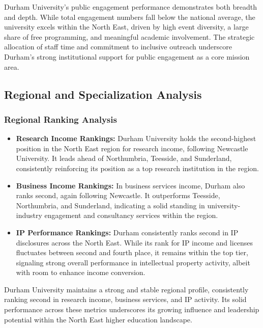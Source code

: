 \documentclass[journal,onecolumn, 10pt,draftclsnofoot]{IEEEtran}
\begin{document}
Durham University's public engagement performance demonstrates both breadth and depth. While total engagement numbers fall below the national average, the university excels within the North East, driven by high event diversity, a large share of free programming, and meaningful academic involvement. The strategic allocation of staff time and commitment to inclusive outreach underscore Durham's strong institutional support for public engagement as a core mission area.

\subsection{Regional and Specialization Analysis}

\subsubsection{Regional Ranking Analysis}

\begin{itemize}
    \item \textbf{Research Income Rankings:} Durham University holds the second-highest position in the North East region for research income, following Newcastle University. It leads ahead of Northumbria, Teesside, and Sunderland, consistently reinforcing its position as a top research institution in the region.
    
    \item \textbf{Business Income Rankings:} In business services income, Durham also ranks second, again following Newcastle. It outperforms Teesside, Northumbria, and Sunderland, indicating a solid standing in university-industry engagement and consultancy services within the region.
    
    \item \textbf{IP Performance Rankings:} Durham consistently ranks second in IP disclosures across the North East. While its rank for IP income and licenses fluctuates between second and fourth place, it remains within the top tier, signaling strong overall performance in intellectual property activity, albeit with room to enhance income conversion.
\end{itemize}

Durham University maintains a strong and stable regional profile, consistently ranking second in research income, business services, and IP activity. Its solid performance across these metrics underscores its growing influence and leadership potential within the North East higher education landscape.
\end{document}
